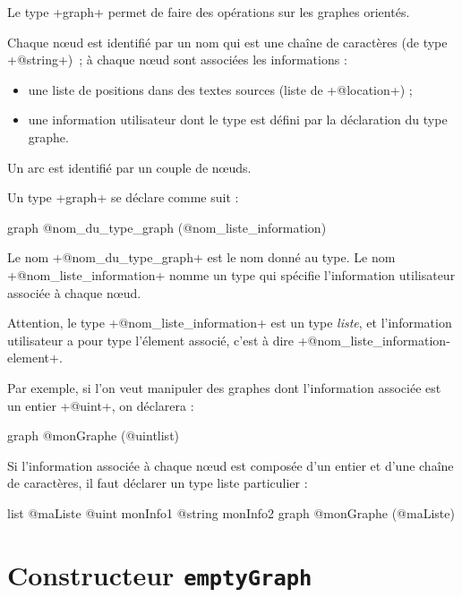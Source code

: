 

Le type \ggs+graph+ permet de faire des opérations sur les graphes orientés.

Chaque nœud est identifié par un nom qui est une chaîne de caractères (de type \ggs+@string+)~; à chaque nœud sont associées les informations :
\begin{itemize}
  \item une liste de positions dans des textes sources (liste de \ggs+@location+) ;
  \item une information utilisateur dont le type est défini par la déclaration du type graphe.
\end{itemize}

Un arc est identifié par un couple de nœuds.


Un type \ggs+graph+ se déclare comme suit :
\begin{galgas}
graph @nom_du_type_graph (@nom_liste_information) {
}
\end{galgas}

Le nom \ggs+@nom_du_type_graph+ est le nom donné au type. Le nom \ggs+@nom_liste_information+ nomme un type qui spécifie l'information utilisateur associée à chaque nœud.

Attention, le type \ggs+@nom_liste_information+ est un type \emph{liste}, et l'information utilisateur a pour type l'élement associé, c'est à dire \ggs+@nom_liste_information-element+. 

Par exemple, si l'on veut manipuler des graphes dont l'information associée est un entier \ggs+@uint+, on déclarera :
\begin{galgas}
graph @monGraphe (@uintlist) {
}
\end{galgas}

Si l'information associée à chaque nœud est composée d'un entier et d'une chaîne de caractères, il faut déclarer un type liste particulier :
\begin{galgas}
list @maListe {
  @uint monInfo1
  @string monInfo2
}
graph @monGraphe (@maListe) {
}
\end{galgas}






\section{Constructeur \texttt{emptyGraph}}

